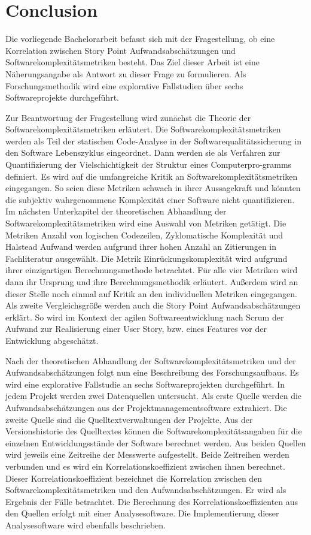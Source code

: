 \chapter{Conclusion}\label{conclusion}

Die vorliegende Bachelorarbeit befasst sich mit der Fragestellung, ob
eine Korrelation zwischen Story Point Aufwandsabschätzungen und
Softwarekomplexitätsmetriken besteht. Das Ziel dieser Arbeit ist eine
Näherungsangabe als Antwort zu dieser Frage zu formulieren. Als
Forschungsmethodik wird eine explorative Fallstudien über sechs
Softwareprojekte durchgeführt.

Zur Beantwortung der Fragestellung wird zunächst die Theorie der
Softwarekomplexitätsmetriken erläutert. Die Softwarekomplexitätsmetriken
werden als Teil der statischen Code-Analyse in der
Softwarequalitätssicherung in den Software Lebenszyklus eingeordnet.
Dann werden sie als Verfahren zur Quantifizierung der Vielschichtigkeit
der Struktur eines Computerpro-gramms definiert. Es wird auf die
umfangreiche Kritik an Softwarekomplexitätsmetriken eingegangen. So
seien diese Metriken schwach in ihrer Aussagekraft und könnten die
subjektiv wahrgenommene Komplexität einer Software nicht quantifizieren.
Im nächsten Unterkapitel der theoretischen Abhandlung der
Softwarekomplexitätsmetriken wird eine Auswahl von Metriken getätigt.
Die Metriken Anzahl von logischen Codezeilen, Zyklomatische Komplexität
und Halstead Aufwand werden aufgrund ihrer hohen Anzahl an Zitierungen
in Fachliteratur ausgewählt. Die Metrik Einrückungskomplexität wird
aufgrund ihrer einzigartigen Berechnungsmethode betrachtet. Für alle
vier Metriken wird dann ihr Ursprung und ihre Berechnungsmethodik
erläutert. Außerdem wird an dieser Stelle noch einmal auf Kritik an den
individuellen Metriken eingegangen. Als zweite Vergleichsgröße werden
auch die Story Point Aufwandsabschätzungen erklärt. So wird im Kontext
der agilen Softwareentwicklung nach Scrum der Aufwand zur Realisierung
einer User Story, bzw. eines Features vor der Entwicklung abgeschätzt.

Nach der theoretischen Abhandlung der Softwarekomplexitätsmetriken und
der Aufwandsabschätzungen folgt nun eine Beschreibung des
Forschungsaufbaus. Es wird eine explorative Fallstudie an sechs
Softwareprojekten durchgeführt. In jedem Projekt werden zwei
Datenquellen untersucht. Als erste Quelle werden die
Aufwandsabschätzungen aus der Projektmanagementsoftware extrahiert. Die
zweite Quelle sind die Quelltextverwaltungen der Projekte. Aus der
Versionshistorie des Quelltextes können die Softwarekomplexitätsangaben
für die einzelnen Entwicklungsstände der Software berechnet werden. Aus
beiden Quellen wird jeweils eine Zeitreihe der Messwerte aufgestellt.
Beide Zeitreihen werden verbunden und es wird ein
Korrelationskoeffizient zwischen ihnen berechnet. Dieser
Korrelationskoeffizient bezeichnet die Korrelation zwischen den
Softwarekomplexitätsmetriken und den Aufwandsabschätzungen. Er wird als
Ergebnis der Fälle betrachtet. Die Berechnung des
Korrelationskoeffizienten aus den Quellen erfolgt mit einer
Analysesoftware. Die Implementierung dieser Analysesoftware wird
ebenfalls beschrieben.

